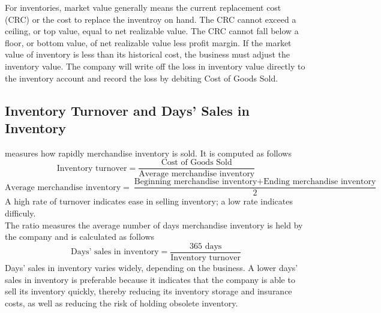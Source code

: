 \documentclass{article}
\begin{document}
For inventories, market value generally means the current replacement cost (CRC) or the cost to replace the inventroy on hand. The CRC cannot exceed a ceiling, or top value, equal to net realizable value. The CRC cannot fall below a floor, or bottom value, of net realizable value less profit margin. If the market value of inventory is less than its historical cost, the business must adjust the inventory value. The company will write off the loss in inventory value directly to the inventory account and record the loss by debiting Cost of Goods Sold. 

\subsection{Inventory Turnover and Days' Sales in Inventory}

 measures how rapidly merchandise inventory is sold. It is computed as follows $$\textrm{Inventory turnover} = \frac{\textrm{Cost of Goods Sold}}{\textrm{Average merchandise inventory}}$$ $$\textrm{Average merchandise inventory} = \frac{\textrm{Beginning merchandise inventory} + \textrm{Ending merchandise inventory}}{2}$$ A high rate of turnover indicates ease in selling inventory; a low rate indicates difficuly. \\ 

The  ratio measures the average number of days merchandise inventory is held by the company and is calculated as follows $$\textrm{Days' sales in inventory} = \frac{\textrm{365 days}}{\textrm{Inventory turnover}}$$ Days' sales in inventory varies widely, depending on the business. A lower days' sales in inventory is preferable because it indicates that the company is able to sell its inventory quickly, thereby reducing its inventory storage and insurance costs, as well as reducing the risk of holding obsolete inventory. 
\end{document}
